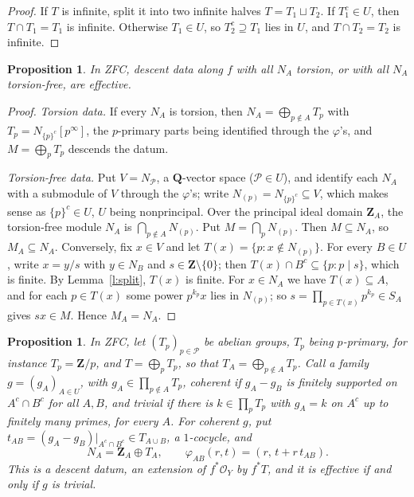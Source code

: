 \documentclass[11pt,a4paper]{amsart}
\newtheorem{proposition}[theorem]{Proposition}
\theoremstyle{definition}
\theoremstyle{remark}
\newcommand{\Z}{\mathbf Z}
\newcommand{\Q}{\mathbf Q}
\newcommand{\Pp}{\mathcal P}
\begin{document}
\begin{proof}
If $T$ is infinite, split it into two infinite halves $T=T_1\sqcup T_2$. If $T_1^c\in U$, then $T\cap T_1=T_1$ is infinite. Otherwise $T_1\in U$, so $T_2^c\supseteq T_1$ lies in $U$, and $T\cap T_2=T_2$ is infinite.
\end{proof}

\begin{proposition}\label{p:tt}
In ZFC, descent data along $f$ with all $N_A$ torsion, or with all $N_A$ torsion-free, are effective.
\end{proposition}

\begin{proof}
\emph{Torsion data.} If every $N_A$ is torsion, then $N_A=\bigoplus_{p\notin A}T_p$ with $T_p=N_{\{p\}^c}[p^\infty]$, the $p$-primary parts being identified through the $\varphi$'s, and $M=\bigoplus_pT_p$ descends the datum.

\emph{Torsion-free data.} Put $V=N_\Pp$, a $\Q$-vector space ($\Pp\in U$), and identify each $N_A$ with a submodule of $V$ through the $\varphi$'s; write $N_{(p)}=N_{\{p\}^c}\subseteq V$, which makes sense as $\{p\}^c\in U$, $U$ being nonprincipal. Over the principal ideal domain $\Z_A$, the torsion-free module $N_A$ is $\bigcap_{p\notin A}N_{(p)}$. Put $M=\bigcap_pN_{(p)}$. Then $M\subseteq N_A$, so $M_A\subseteq N_A$. Conversely, fix $x\in V$ and let $T(x)=\{p:x\notin N_{(p)}\}$. For every $B\in U$, write $x=y/s$ with $y\in N_B$ and $s\in\Z\setminus\{0\}$; then $T(x)\cap B^c\subseteq\{p:p\mid s\}$, which is finite. By Lemma~\ref{l:split}, $T(x)$ is finite. For $x\in N_A$ we have $T(x)\subseteq A$, and for each $p\in T(x)$ some power $p^{k_p}x$ lies in $N_{(p)}$; so $s=\prod_{p\in T(x)}p^{k_p}\in S_A$ gives $sx\in M$. Hence $M_A=N_A$.
\end{proof}

\begin{proposition}\label{p:obstr}
In ZFC, let $(T_p)_{p\in\Pp}$ be abelian groups, $T_p$ being $p$-primary, for instance $T_p=\Z/p$, and $T=\bigoplus_pT_p$, so that $T_A=\bigoplus_{p\notin A}T_p$. Call a family $g=(g_A)_{A\in U}$, with $g_A\in\prod_{p\notin A}T_p$, \emph{coherent} if $g_A-g_B$ is finitely supported on $A^c\cap B^c$ for all $A,B$, and \emph{trivial} if there is $k\in\prod_pT_p$ with $g_A=k$ on $A^c$ up to finitely many primes, for every $A$. For coherent $g$, put $t_{AB}=(g_A-g_B)|_{A^c\cap B^c}\in T_{A\cup B}$, a $1$-cocycle, and
\[
N_A=\Z_A\oplus T_A,\qquad\varphi_{AB}(r,t)=(r,\,t+r\,t_{AB}).
\]
This is a descent datum, an extension of $f^*\mathcal O_Y$ by $f^*T$, and it is effective if and only if $g$ is trivial.
\end{proposition}
\end{document}
